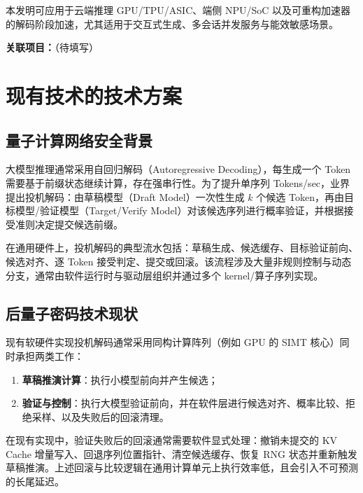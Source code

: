 \documentclass[12pt,a4paper]{article}
\begin{document}
本发明可应用于云端推理 GPU/TPU/ASIC、端侧 NPU/SoC 以及可重构加速器的解码阶段加速，尤其适用于交互式生成、多会话并发服务与能效敏感场景。

\textbf{关联项目：}\underline{\hspace{8cm}}（待填写）

\section{现有技术的技术方案}

\subsection{量子计算网络安全背景}

大模型推理通常采用自回归解码（Autoregressive Decoding），每生成一个 Token 需要基于前缀状态继续计算，存在强串行性。为了提升单序列 Tokens/sec，业界提出投机解码：由草稿模型（Draft Model）一次性生成 $k$ 个候选 Token，再由目标模型/验证模型（Target/Verify Model）对该候选序列进行概率验证，并根据接受准则决定提交候选前缀。

在通用硬件上，投机解码的典型流水包括：草稿生成、候选缓存、目标验证前向、候选对齐、逐 Token 接受判定、提交或回滚。该流程涉及大量非规则控制与动态分支，通常由软件运行时与驱动层组织并通过多个 kernel/算子序列实现。

\subsection{后量子密码技术现状}

现有软硬件实现投机解码通常采用同构计算阵列（例如 GPU 的 SIMT 核心）同时承担两类工作：
\begin{enumerate}
    \item \textbf{草稿推演计算}：执行小模型前向并产生候选；
    \item \textbf{验证与控制}：执行大模型验证前向，并在软件层进行候选对齐、概率比较、拒绝采样、以及失败后的回滚清理。
\end{enumerate}

在现有实现中，验证失败后的回滚通常需要软件显式处理：撤销未提交的 KV Cache 增量写入、回退序列位置指针、清空候选缓存、恢复 RNG 状态并重新触发草稿推演。上述回滚与比较逻辑在通用计算单元上执行效率低，且会引入不可预测的长尾延迟。

\end{document}
